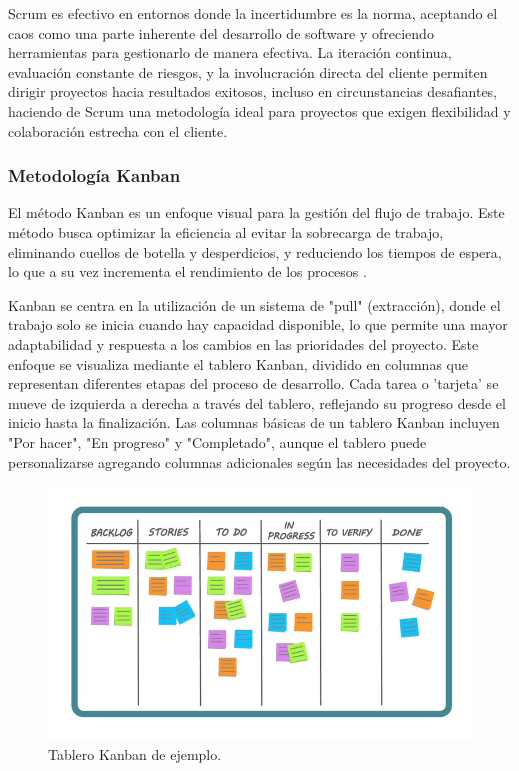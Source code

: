 \documentclass[main.tex]{subfiles}
\begin{document}
Scrum es efectivo en entornos donde la incertidumbre es la norma, aceptando el caos como una parte inherente del desarrollo de software y ofreciendo herramientas para gestionarlo de manera efectiva. La iteración continua, evaluación constante de riesgos, y la involucración directa del cliente permiten dirigir proyectos hacia resultados exitosos, incluso en circunstancias desafiantes, haciendo de Scrum una metodología ideal para proyectos que exigen flexibilidad y colaboración estrecha con el cliente.

\subsubsection{Metodología Kanban}

El método Kanban es un enfoque visual para la gestión del flujo de trabajo. Este método busca optimizar la eficiencia al evitar la sobrecarga de trabajo, eliminando cuellos de botella y desperdicios, y reduciendo los tiempos de espera, lo que a su vez incrementa el rendimiento de los procesos \cite{alaidaros2021kanban}.

Kanban se centra en la utilización de un sistema de "pull" (extracción), donde el trabajo solo se inicia cuando hay capacidad disponible, lo que permite una mayor adaptabilidad y respuesta a los cambios en las prioridades del proyecto. Este enfoque se visualiza mediante el tablero Kanban, dividido en columnas que representan diferentes etapas del proceso de desarrollo. Cada tarea o 'tarjeta' se mueve de izquierda a derecha a través del tablero, reflejando su progreso desde el inicio hasta la finalización. Las columnas básicas de un tablero Kanban incluyen "Por hacer", "En progreso" y "Completado", aunque el tablero puede personalizarse agregando columnas adicionales según las necesidades del proyecto.

\begin{figure}[h]
	\centering
	\includegraphics[width=\linewidth]{./assets/model-kanban.png}
	\caption{Tablero Kanban de ejemplo.}
\end{figure}
\end{document}
